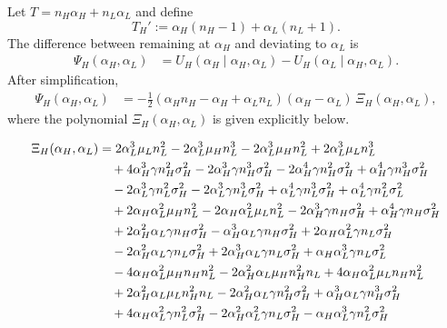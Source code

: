 \documentclass[a4paper,12pt]{article}
\theoremstyle{definition}
\theoremstyle{remark}
\newcommand{\1}{\mathbf{1}}
\begin{document}
Let $T = n_H \alpha_H + n_L \alpha_L$ and define
\[
    T_H' := \alpha_H(n_H-1) + \alpha_L(n_L+1).
\]
The difference between remaining at $\alpha_H$ and deviating to $\alpha_L$ is
\begin{align}
    \Psi_H(\alpha_H,\alpha_L)
    &= U_H(\alpha_H \mid \alpha_H,\alpha_L)
       - U_H(\alpha_L \mid \alpha_H,\alpha_L).
\end{align}
After simplification,
\begin{align}
    \Psi_H(\alpha_H,\alpha_L)
    &= -\frac{1}{2}
       (\alpha_H n_H - \alpha_H + \alpha_L n_L)
       (\alpha_H - \alpha_L)\,
       \Xi_H(\alpha_H,\alpha_L), \label{eq:PsiH-app}
\end{align}
where the polynomial $\Xi_H(\alpha_H,\alpha_L)$ is given explicitly below.

\begin{align}
    \Xi_H(\alpha_H,\alpha_L)
    &= 2 \alpha_L^3 \mu_L n_L^2 - 2 \alpha_L^3 \mu_H n_L^3 - 2 \alpha_L^3 \mu_H n_L^2 + 2 \alpha_L^3 \mu_L n_L^3 \notag\\
    &\quad + 4 \alpha_H^3 \gamma n_H^2 \sigma_H^2 - 2 \alpha_H^3 \gamma n_H^3 \sigma_H^2 - 2 \alpha_H^4 \gamma n_H^2 \sigma_H^2 + \alpha_H^4 \gamma n_H^3 \sigma_H^2 \notag\\
    &\quad - 2 \alpha_L^3 \gamma n_L^2 \sigma_H^2 - 2 \alpha_L^3 \gamma n_L^3 \sigma_H^2 + \alpha_L^4 \gamma n_L^3 \sigma_H^2 + \alpha_L^4 \gamma n_L^2 \sigma_L^2 \notag\\
    &\quad + 2 \alpha_H \alpha_L^2 \mu_H n_L^2 - 2 \alpha_H \alpha_L^2 \mu_L n_L^2 - 2 \alpha_H^3 \gamma n_H \sigma_H^2 + \alpha_H^4 \gamma n_H \sigma_H^2 \notag\\
    &\quad + 2 \alpha_H^2 \alpha_L \gamma n_H \sigma_H^2 - \alpha_H^3 \alpha_L \gamma n_H \sigma_H^2 + 2 \alpha_H \alpha_L^2 \gamma n_L \sigma_H^2 \notag\\
    &\quad - 2 \alpha_H^2 \alpha_L \gamma n_L \sigma_H^2 + 2 \alpha_H^3 \alpha_L \gamma n_L \sigma_H^2 + \alpha_H \alpha_L^3 \gamma n_L \sigma_L^2 \notag\\
    &\quad - 4 \alpha_H \alpha_L^2 \mu_H n_H n_L^2 - 2 \alpha_H^2 \alpha_L \mu_H n_H^2 n_L + 4 \alpha_H \alpha_L^2 \mu_L n_H n_L^2 \notag\\
    &\quad + 2 \alpha_H^2 \alpha_L \mu_L n_H^2 n_L - 2 \alpha_H^2 \alpha_L \gamma n_H^2 \sigma_H^2 + \alpha_H^3 \alpha_L \gamma n_H^3 \sigma_H^2 \notag\\
    &\quad + 4 \alpha_H \alpha_L^2 \gamma n_L^2 \sigma_H^2 - 2 \alpha_H^2 \alpha_L^2 \gamma n_L \sigma_H^2 - \alpha_H \alpha_L^3 \gamma n_L^2 \sigma_H^2 \notag\\

\end{align}
\end{document}
